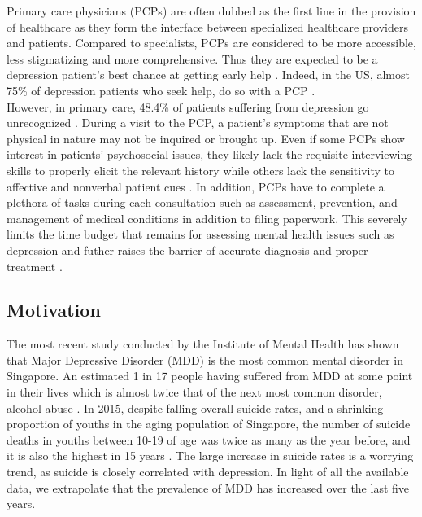 \documentclass{article}
\begin{document}
	Primary care physicians (PCPs) are often dubbed as the first line in the provision of healthcare as they form the interface between specialized healthcare providers and patients. Compared to specialists, PCPs are considered to be more accessible, less stigmatizing and more comprehensive. Thus they are expected to be a depression patient's best chance at getting early help \cite{rothman2003}. Indeed, in the US, almost 75\% of depression patients who seek help, do so with a PCP \cite{goldman1999}. \\ 

	However, in primary care, 48.4\% of patients suffering from depression go unrecognized \cite{jama2003}. During a visit to the PCP, a patient's symptoms that are not physical in nature may not be inquired or brought up. Even if some PCPs show interest in patients' psychosocial issues, they likely lack the requisite interviewing skills to properly elicit the relevant history while others lack the sensitivity to affective and nonverbal patient cues \cite{badger1994}. In addition, PCPs have to complete a plethora of tasks during each consultation such as assessment, prevention, and management of medical conditions in addition to filing paperwork. This severely limits the time budget that remains for assessing mental health issues such as depression and futher raises the barrier of accurate diagnosis and proper treatment \cite{telford2002}. \\

	\subsection{Motivation}
	The most recent study conducted by the Institute of Mental Health has shown that Major Depressive Disorder (MDD) is the most common mental disorder in Singapore. An estimated 1 in 17 people having suffered from MDD at some point in their lives which is almost twice that of the next most common disorder, alcohol abuse \cite{annacadmedsg}. In 2015, despite falling overall suicide rates, and a shrinking proportion of youths in the aging population of Singapore, the number of suicide deaths in youths between 10-19 of age was twice as many as the year before, and it is also the highest in 15 years \cite{samaritansofsingapore2016}. The large increase in suicide rates is a worrying trend, as suicide is closely correlated with depression. In light of all the available data, we extrapolate that the prevalence of MDD has increased over the last five years. \\
\end{document}
